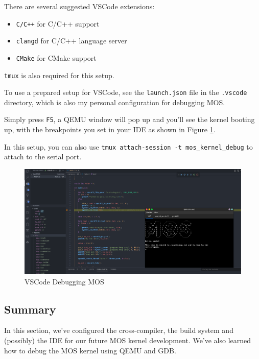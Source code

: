 \begin{tip}
    \item There are several suggested VSCode extensions:
    \begin{itemize}
        \item \texttt{C/C++} for C/C++ support
        \item \texttt{clangd} for C/C++ language server
        \item \texttt{CMake} for CMake support
    \end{itemize}
    \item \texttt{tmux} is also required for this setup.
\end{tip}

To use a prepared setup for VSCode, see the \texttt{launch.json} file in the \texttt{.vscode}
directory, which is also my personal configuration for debugging MOS.

Simply press \texttt{F5}, a QEMU window will pop up and you'll see the kernel booting up, with
the breakpoints you set in your IDE as shown in Figure \ref{fig:vscode-debugging}.

In this setup, you can also use \texttt{tmux attach-session -t mos\_kernel\_debug} to attach to the serial
port.

\begin{figure}[ht]
    \centering
    \includegraphics[width=\textwidth]{assets/c1.vscode-debugging.png}
    \caption{VSCode Debugging MOS}
    \label{fig:vscode-debugging}
\end{figure}

\subsection{Summary}

In this section, we've configured the cross-compiler, the build system and (possibly) the IDE for
our future MOS kernel development. We've also learned how to debug the MOS kernel using QEMU and GDB.

